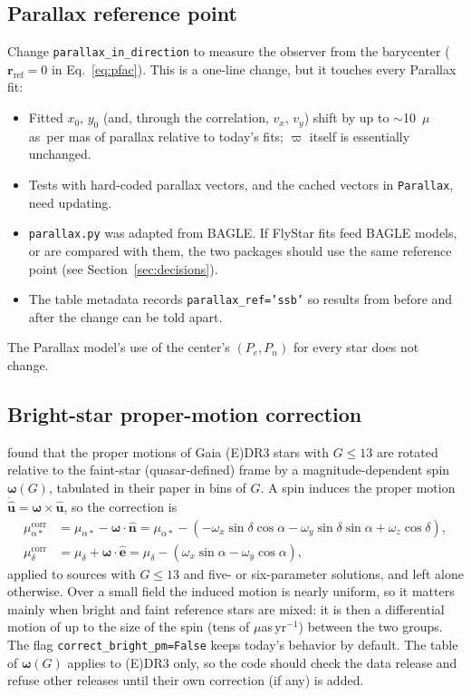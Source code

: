 \documentclass[11pt]{article}
\newcommand{\code}[1]{\texttt{#1}}
\newcommand{\muas}{$\mu$as}
\newcommand{\uvec}[1]{\hat{\mathbf #1}}
\begin{document}
\subsection{Parallax reference point}

Change \code{parallax\_in\_direction} to measure the observer from the
barycenter ($\mathbf r_\mathrm{ref} = 0$ in Eq.~\eqref{eq:pfac}). This is a
one-line change, but it touches every Parallax fit:
\begin{itemize}
  \item Fitted $x_0$, $y_0$ (and, through the correlation, $v_x$, $v_y$)
    shift by up to $\sim$10~\muas\ per mas of parallax relative to today's
    fits; $\varpi$ itself is essentially unchanged.
  \item Tests with hard-coded parallax vectors, and the cached vectors in
    \code{Parallax}, need updating.
  \item \code{parallax.py} was adapted from BAGLE. If FlyStar fits feed BAGLE
    models, or are compared with them, the two packages should use the same
    reference point (see Section~\ref{sec:decisions}).
  \item The table metadata records \code{parallax\_ref='ssb'} so results from
    before and after the change can be told apart.
\end{itemize}
The Parallax model's use of the center's $(P_e,P_n)$ for every star does not
change.

\subsection{Bright-star proper-motion correction}
\label{sec:brightpm}

\citet{CantatGaudin2021} found that the proper motions of Gaia (E)DR3 stars
with $G \le 13$ are rotated relative to the faint-star (quasar-defined) frame
by a magnitude-dependent spin $\boldsymbol\omega(G)$, tabulated in their paper
in bins of $G$. A spin induces the proper motion $\dot{\uvec u} =
\boldsymbol\omega\times\uvec u$, so the correction is
\begin{align}
  \mu_{\alpha*}^\mathrm{corr} &= \mu_{\alpha*} - \boldsymbol\omega\cdot\uvec n
  = \mu_{\alpha*} - \left(-\omega_x\sin\delta\cos\alpha - \omega_y\sin\delta\sin\alpha + \omega_z\cos\delta\right),
  \nonumber\\
  \mu_\delta^\mathrm{corr} &= \mu_\delta + \boldsymbol\omega\cdot\uvec e
  = \mu_\delta - \left(\omega_x\sin\alpha - \omega_y\cos\alpha\right),
  \label{eq:brightpm}
\end{align}
applied to sources with $G \le 13$ and five- or six-parameter solutions, and
left alone otherwise. Over a small field the induced motion is nearly
uniform, so it matters mainly when bright and faint reference stars are mixed:
it is then a differential motion of up to the size of the spin (tens of
\muas\,yr$^{-1}$) between the two groups. The flag
\code{correct\_bright\_pm=False} keeps today's behavior by default. The table
of $\boldsymbol\omega(G)$ applies to (E)DR3 only, so the code should check
the data release and refuse other releases until their own correction (if any)
is added.
\end{document}
